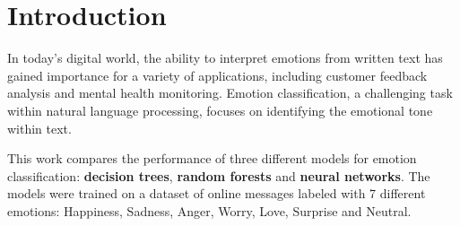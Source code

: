 \section{Introduction}
\label{sec:introduction}
In today's digital world, the ability 
to interpret emotions from written text 
has gained importance for a variety of 
applications, including customer feedback 
analysis and mental health monitoring. 
Emotion classification, a challenging 
task within natural language processing, 
focuses on identifying the emotional 
tone within text.

This work compares the performance of
three different models for emotion
classification: \textbf{decision trees}, \textbf{random
forests} and \textbf{neural networks}. The models
were trained on a dataset of online 
messages labeled with 7 different
emotions: Happiness, Sadness, Anger,
Worry, Love, Surprise and Neutral.